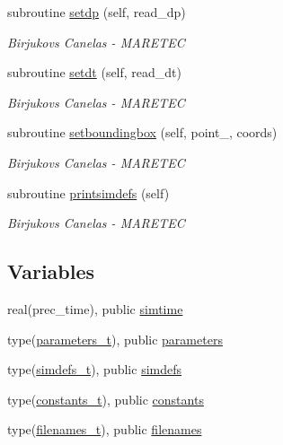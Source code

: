 \begin{DoxyCompactItemize}
subroutine \mbox{\hyperlink{namespacesimulation__globals_a9a8e88c06937b7cf6be9d9bf30f54ba9}{setdp}} (self, read\+\_\+dp)
\begin{DoxyCompactList}\small\item\em Birjukovs Canelas -\/ M\+A\+R\+E\+T\+EC \end{DoxyCompactList}\item 
subroutine \mbox{\hyperlink{namespacesimulation__globals_a3ef0462db5a60ac79304cabd2fdd914d}{setdt}} (self, read\+\_\+dt)
\begin{DoxyCompactList}\small\item\em Birjukovs Canelas -\/ M\+A\+R\+E\+T\+EC \end{DoxyCompactList}\item 
subroutine \mbox{\hyperlink{namespacesimulation__globals_a1fc4653684d73efecdbd140b6cafe541}{setboundingbox}} (self, point\+\_\+, coords)
\begin{DoxyCompactList}\small\item\em Birjukovs Canelas -\/ M\+A\+R\+E\+T\+EC \end{DoxyCompactList}\item 
subroutine \mbox{\hyperlink{namespacesimulation__globals_ad90d6959da1d43e2cd1febff82187ed5}{printsimdefs}} (self)
\begin{DoxyCompactList}\small\item\em Birjukovs Canelas -\/ M\+A\+R\+E\+T\+EC \end{DoxyCompactList}\end{DoxyCompactItemize}
\subsection*{Variables}
\begin{DoxyCompactItemize}
\item 
real(prec\+\_\+time), public \mbox{\hyperlink{namespacesimulation__globals_a10daac198c63b06f99ec0c01b614a352}{simtime}}
\item 
type(\mbox{\hyperlink{structsimulation__globals_1_1parameters__t}{parameters\+\_\+t}}), public \mbox{\hyperlink{namespacesimulation__globals_ac23e87cbb2256792d683ab1bf5dc5e21}{parameters}}
\item 
type(\mbox{\hyperlink{structsimulation__globals_1_1simdefs__t}{simdefs\+\_\+t}}), public \mbox{\hyperlink{namespacesimulation__globals_ae851f977b442737307cd4bb76f2f68be}{simdefs}}
\item 
type(\mbox{\hyperlink{structsimulation__globals_1_1constants__t}{constants\+\_\+t}}), public \mbox{\hyperlink{namespacesimulation__globals_aa3e1a54abbb08d2c09978a3509ec4303}{constants}}
\item 
type(\mbox{\hyperlink{structsimulation__globals_1_1filenames__t}{filenames\+\_\+t}}), public \mbox{\hyperlink{namespacesimulation__globals_ada5ae97821ffcb77674c3470431101e3}{filenames}}
\end{DoxyCompactItemize}


